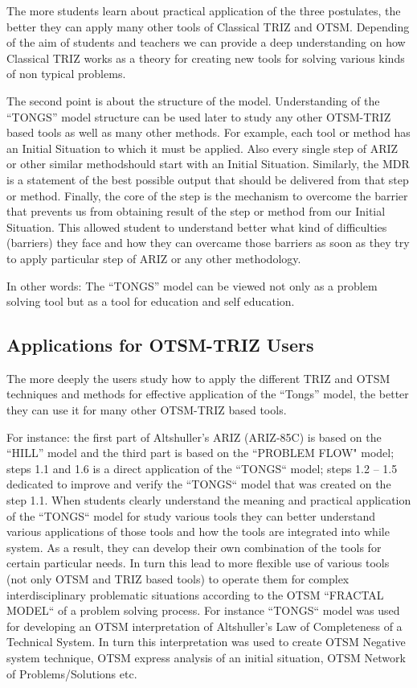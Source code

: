\documentclass[11pt,a4paper]{article}
\begin{document}
The more students learn about practical application of the three postulates,
the better they can apply many other tools of Classical TRIZ and OTSM.
Depending of the aim of students and teachers we can provide a deep
understanding on how Classical TRIZ works as a theory for creating new tools
for solving various kinds of non typical problems.

The second point is about the structure of the model. Understanding of the
“TONGS” model structure can be used later to study any other OTSM-TRIZ based
tools as well as many other methods.  For example, each tool or method has an
Initial Situation to which it must be applied. Also every single step of ARIZ
or other similar methodshould start with an Initial Situation. Similarly, the
MDR is a statement of the best possible output that should be delivered from
that step or method. Finally, the core of the step is the mechanism to
overcome the barrier that prevents us from obtaining result of the step or
method from our Initial Situation.  This allowed student to understand better
what kind of difficulties (barriers) they face and how they can overcame those
barriers as soon as they try to apply particular step of ARIZ or any other
methodology.

In other words: The “TONGS” model can be viewed not only as a problem solving
tool but as a tool for education and self education.

\subsection{Applications for OTSM-TRIZ Users}

The more deeply the users study how to apply the different TRIZ and OTSM
techniques and methods for effective application of the “Tongs” model, the
better they can use it for many other OTSM-TRIZ based tools.

For instance: the first part of Altshuller’s ARIZ (ARIZ-85C) is based on the
“HILL” model and the third part is based on the “PROBLEM FLOW" model; steps
1.1 and 1.6 is a direct application of the “TONGS“ model; steps 1.2 – 1.5
dedicated to improve and verify the “TONGS“ model that was created on the step
1.1.  When students clearly understand the meaning and practical application
of the “TONGS“ model for study various tools they can better understand
various applications of those tools and how the tools are integrated into
while system. As a result, they can develop their own combination of the tools
for certain particular needs.  In turn this lead to more flexible use of
various tools (not only OTSM and TRIZ based tools) to operate them for complex
interdisciplinary problematic situations according to the OTSM “FRACTAL MODEL“
of a problem solving process.  For instance “TONGS“ model was used for
developing an OTSM interpretation of Altshuller's Law of Completeness of a
Technical System.  In turn this interpretation was used to create OTSM
Negative system technique, OTSM express analysis of an initial situation, OTSM
Network of Problems/Solutions etc.
\end{document}

